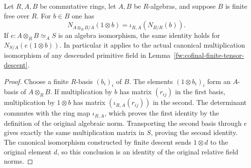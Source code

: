 \begin{lemma}
\label{fw:algebraic-norm-tensor-basechange}
\leanok
Let $R,A,B$ be commutative rings, let $A,B$ be $R$-algebras, and
suppose $B$ is finite free over $R$. For $b\in B$ one has
\[
 N_{A\otimes_R B/A}(1\otimes b)
   =\iota_{R,A}(N_{B/R}(b)).
\]
If $e:A\otimes_R B\simeq_A S$ is an algebra isomorphism, the same
identity holds for $N_{S/A}(e(1\otimes b))$. In particular it applies
to the actual canonical multiplication isomorphism of any descended
primitive field in Lemma~\ref{fw:cofinal-finite-tensor-descent}.
\end{lemma}
\begin{proof}
Choose a finite $R$-basis $(b_i)_i$ of $B$.
The elements $(1\otimes b_i)_i$ form an $A$-basis of $A\otimes_R B$.
If multiplication by $b$ has matrix $(r_{ij})$ in the first basis,
multiplication by $1\otimes b$ has matrix
$(\iota_{R,A}(r_{ij}))$ in the second. The determinant commutes
with the ring map $\iota_{R,A}$, which proves the first identity
by the definition of the original algebraic norm.
Transporting the second basis through $e$ gives exactly the same
multiplication matrix in $S$, proving the second identity.
The canonical isomorphism constructed by finite descent sends
$1\otimes d$ to the original element $d$, so this conclusion is
an identity of the original relative field norms.
\end{proof}

